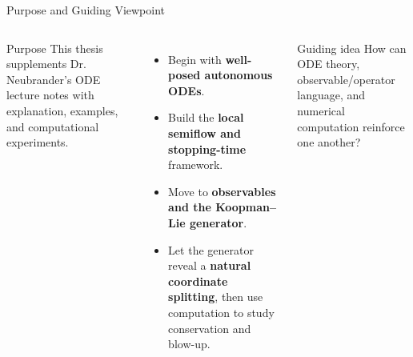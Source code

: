 \documentclass[aspectratio=169,11pt]{beamer}
\newcommand{\highlight}[1]{\textcolor{LSUPurple}{\textbf{#1}}}
\begin{document}
\begin{frame}{Purpose and Guiding Viewpoint}
\footnotesize
\begin{columns}[T,onlytextwidth]
\begin{block}{Purpose}
This thesis supplements Dr. Neubrander's ODE lecture notes with explanation, examples, and computational experiments.
\end{block}

\begin{itemize}
  \item Begin with \highlight{well-posed autonomous ODEs}.
  \item Build the \highlight{local semiflow and stopping-time} framework.
  \item Move to \highlight{observables and the Koopman--Lie generator}.
  \item Let the generator reveal a \highlight{natural coordinate splitting}, then use computation to study conservation and blow-up.
\end{itemize}

\begin{alertblock}{Guiding idea}
How can ODE theory, observable/operator language, and numerical computation reinforce one another?
\end{alertblock}

\centering
{}
\end{columns}
\end{frame}
\end{document}
